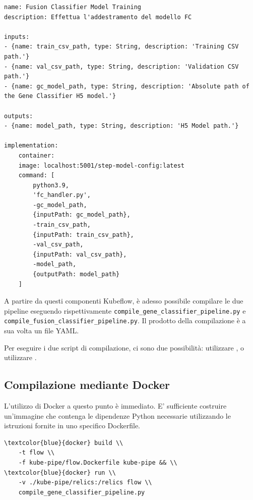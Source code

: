 \begin{code}
\label{code:apx:a:yaml}
\begin{verbatim}
name: Fusion Classifier Model Training
description: Effettua l'addestramento del modello FC

inputs:
- {name: train_csv_path, type: String, description: 'Training CSV path.'}
- {name: val_csv_path, type: String, description: 'Validation CSV path.'}
- {name: gc_model_path, type: String, description: 'Absolute path of the Gene Classifier H5 model.'}

outputs:
- {name: model_path, type: String, description: 'H5 Model path.'}

implementation:
    container:
    image: localhost:5001/step-model-config:latest
    command: [
        python3.9,
        'fc_handler.py',
        -gc_model_path, 
        {inputPath: gc_model_path},
        -train_csv_path, 
        {inputPath: train_csv_path},
        -val_csv_path, 
        {inputPath: val_csv_path},
        -model_path, 
        {outputPath: model_path}
    ]
\end{verbatim}
\end{code}

A partire da questi componenti Kubeflow, è adesso possibile compilare le due pipeline eseguendo rispettivamente {\small \verb|compile_gene_classifier_pipeline.py|} e {\small \verb|compile_fusion_classifier_pipeline.py|}. Il prodotto della compilazione è a sua volta un file YAML.

Per eseguire i due script di compilazione, ci sono due possibilità: utilizzare , o utilizzare . 

\subsection{Compilazione mediante Docker}

L'utilizzo di Docker a questo punto è immediato. E' sufficiente costruire un'immagine che contenga le dipendenze Python necessarie utilizzando le istruzioni fornite in uno specifico Dockerfile.

\begin{small}
\begin{Verbatim}[commandchars=\\\{\}]
\textcolor{blue}{docker} build \\
    -t flow \\
    -f kube-pipe/flow.Dockerfile kube-pipe && \\
\textcolor{blue}{docker} run \\
    -v ./kube-pipe/relics:/relics flow \\
    compile_gene_classifier_pipeline.py
\end{Verbatim}
\end{small}

